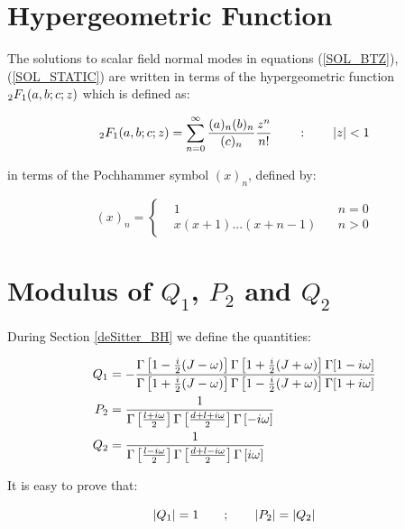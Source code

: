 \documentclass[11pt,a4paper]{article}
\begin{document}
{\section{Hypergeometric Function}

The solutions to scalar field normal modes in equations (\ref{SOL_BTZ}), (\ref{SOL_STATIC}) are written in terms of the hypergeometric function ${}_2F_1(a,b;c;z)$ which is defined as:

\begin{equation}
    {}_2F_1(a,b;c;z) = \sum^{\infty}_{n=0} \frac{(a)_n(b)_n}{(c)_n}\frac{z^n}{n!} ~~~~~~:~~~~~~ \left| z \right| < 1
\end{equation}

{\noindent in terms of the Pochhammer symbol $(x)_n$, defined by: }

\begin{equation}
    (x)_n=\left\{
        \begin{aligned}
            &1 &n=0 \\
            &x(x+1)...(x+n-1) ~~~~ &n>0
        \end{aligned}
        \right.
\end{equation}

\section{Modulus of \texorpdfstring{$Q_1$}{TEXT}, \texorpdfstring{$P_2$}{TEXT} and \texorpdfstring{$Q_2$}{TEXT}}

During Section \ref{deSitter_BH} we define the quantities:

\begin{equation}
    \begin{aligned}
        Q_1 &= - \frac{\Gamma\left[1-\frac{i}{2}(J-\omega)\right]\Gamma\left[1+\frac{i}{2}(J+\omega)\right]\Gamma[1-i\omega]}{\Gamma\left[1+\frac{i}{2}(J-\omega)\right]\Gamma\left[1-\frac{i}{2}(J+\omega)\right]\Gamma[1+i\omega]}\\
        P_2 &=\frac{1}{\Gamma\left[\frac{l+i\omega}{2}\right]\Gamma\left[\frac{d+l+i\omega}{2}\right]\Gamma\left[-i\omega\right]} \\
        Q_2 &=\frac{1}{\Gamma\left[\frac{l-i\omega}{2}\right]\Gamma\left[\frac{d+l-i\omega}{2}\right]\Gamma\left[i\omega\right]} 
    \end{aligned}
\end{equation}

{\noindent It is easy to prove that:}

\begin{equation}\LA{MODULUS}
    \abs{Q_1} = 1 ~~~~~~;~~~~~~ \abs{P_2} = \abs{Q_2}
\end{equation}

}
\end{document}
